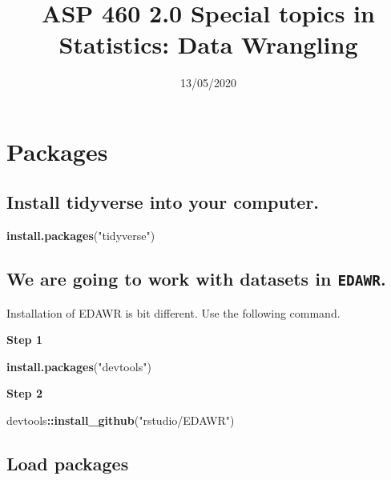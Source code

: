 \documentclass[]{article}
\title{ASP 460 2.0 Special topics in Statistics: Data Wrangling}
\author{}
\date{\vspace{-2.5em}13/05/2020}
\newenvironment{Shaded}{\begin{snugshade}}{\end{snugshade}}
\newcommand{\KeywordTok}[1]{\textcolor[rgb]{0.13,0.29,0.53}{\textbf{#1}}}
\newcommand{\NormalTok}[1]{#1}
\newcommand{\OperatorTok}[1]{\textcolor[rgb]{0.81,0.36,0.00}{\textbf{#1}}}
\newcommand{\StringTok}[1]{\textcolor[rgb]{0.31,0.60,0.02}{#1}}
\begin{document}
\maketitle

\hypertarget{packages}{%
\section{Packages}\label{packages}}

\hypertarget{install-tidyverse-into-your-computer.}{%
\subsection{Install tidyverse into your
computer.}\label{install-tidyverse-into-your-computer.}}

\begin{Shaded}
\begin{Highlighting}[]
\KeywordTok{install.packages}\NormalTok{(}\StringTok{"tidyverse"}\NormalTok{)}
\end{Highlighting}
\end{Shaded}

\hypertarget{we-are-going-to-work-with-datasets-in-edawr.}{%
\subsection{\texorpdfstring{We are going to work with datasets in
\texttt{EDAWR}.}{We are going to work with datasets in EDAWR.}}\label{we-are-going-to-work-with-datasets-in-edawr.}}

Installation of EDAWR is bit different. Use the following command.

\textbf{Step 1}

\begin{Shaded}
\begin{Highlighting}[]
\KeywordTok{install.packages}\NormalTok{(}\StringTok{"devtools"}\NormalTok{)}
\end{Highlighting}
\end{Shaded}

\textbf{Step 2}

\begin{Shaded}
\begin{Highlighting}[]
\NormalTok{devtools}\OperatorTok{::}\KeywordTok{install_github}\NormalTok{(}\StringTok{"rstudio/EDAWR"}\NormalTok{)}
\end{Highlighting}
\end{Shaded}

\hypertarget{load-packages}{%
\subsection{Load packages}\label{load-packages}}
\end{document}
